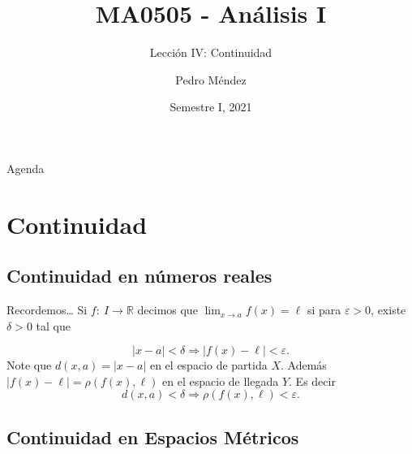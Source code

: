 \documentclass[utf8]{beamer}
\title[MA0505]{MA0505 - An\'alisis I}
\subtitle{Lecci\'on IV: Continuidad}
\author{Pedro M\'endez\inst{1}}
\institute[Universidad de Costa Rica] %
{
  \inst{1}%
  Departmento de Matem\'atica Pura y Ciencias Actuariales\\
  Universidad de Costa Rica
  }
\date[I-2021] {Semestre I, 2021}
\theoremstyle{plain}
\theoremstyle{definition}
\theoremstyle{remark}
\numberwithin{equation}{section}
\newcommand{\dl}{\delta}                %
\newcommand{\eps}{\varepsilon}          %
\newcommand{\bR}{\mathbb{R}}    %
\renewcommand{\l}{\ell}                   %
\newcommand{\To}{\Rightarrow}
\begin{document}
\begin{frame}
  \titlepage
\end{frame}

\begin{frame}{Agenda}
  \tableofcontents
\end{frame}





\section{Continuidad}

\subsection{Continuidad en n\'umeros reales}

\begin{frame}{Recordemos\dots}%
Si $f:\ I\to\bR$ decimos que $\lim_{x\to a}f(x)=\l$ si para $\eps>0$, existe $\dl>0$ tal que 

$$|x-a|<\dl\To |f(x)-\l|<\eps.$$
Note que $d(x,a)=|x-a|$ en el espacio de partida $X$. Adem\'as $|f(x)-\l|=\rho(f(x),\l)$ en el espacio de llegada $Y$. Es decir
$$d(x,a)<\dl\To\rho(f(x),\l)<\eps.$$

\end{frame}

\subsection{Continuidad en Espacios M\'etricos}
\end{document}
